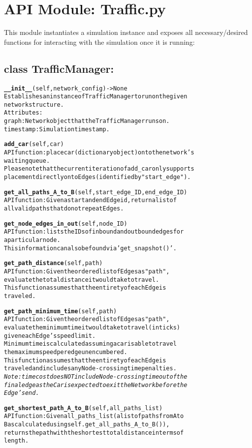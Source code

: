 \section{API Module: Traffic.py}
This module instantiates a simulation instance and exposes all necessary/desired functions for interacting with the simulation once it is running:

\subsection{class TrafficManager:}

\begin{alltt}
\textbf{__init__}(self, network_config) -> None
Establishes an instance of TrafficManager to run on the given 
network structure.
Attributes:
    graph:  Network object that the TrafficManager runs on.
    timestamp:  Simulation timestamp.

\textbf{add_car}(self, car)
API function:  place car (dictionary object) onto the network's 
waiting queue.
Please note that the current iteration of add_car only supports 
placement directly onto Edges (identified by "start_edge").

\textbf{get_all_paths_A_to_B}(self, start_edge_ID, end_edge_ID)
API function:  Given a start and end Edge id, return a list of 
all valid paths that do not repeat Edges.

\textbf{get_node_edges_in_out}(self, node_ID)
API function:  lists the IDs of inbound and outbound edges for 
a particular node.
This information can also be found via 'get_snapshot()'.

\textbf{get_path_distance}(self, path)
API function:  Given the ordered list of Edges as "path", 
evaluate the total distance it would take to travel.
This function assumes that the entirety of each Edge is 
traveled.

\textbf{get_path_minimum_time}(self, path)
API function:  Given the ordered list of Edges as "path", 
evaluate the minimum time it would take to travel (in ticks) 
given each Edge's speed limit.
Minimum time is calculated assuming a car is able to travel 
the maximum speed per edge unencumbered.
This function assumes that the entirety of each Edge is 
traveled and includes any Node-crossing time penalties.
\textit{Note:  time cost does NOT include Node-crossing time out of the 
final edge as the Car is expected to exit the Network before the 
Edge's end.}

\textbf{get_shortest_path_A_to_B}(self, all_paths_list)
API function:  Given all_paths_list (a list of paths from A to 
B as calculated using self.get_all_paths_A_to_B()),
returns the path with the shortest total distance in terms of 
length.


\end{alltt}
